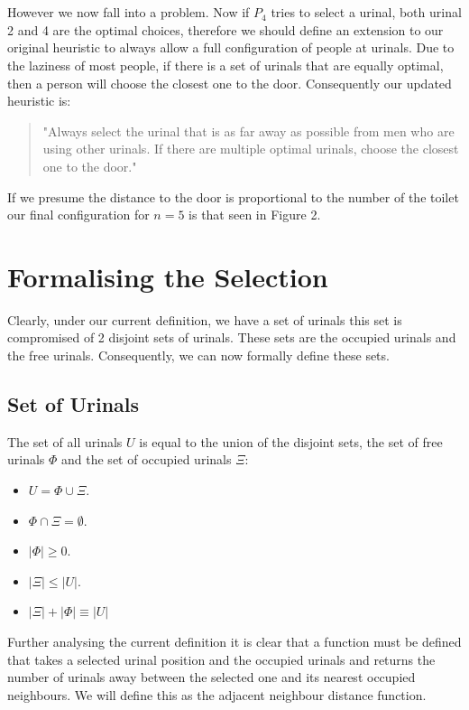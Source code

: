 \documentclass{article}
\begin{document}
\\\\However we now fall into a problem. Now if $P_{4}$ tries to select a urinal, both urinal 2 and 4 are the optimal choices, therefore we should define an extension to our original heuristic to always allow a full configuration of people at urinals. Due to the laziness of most people, if there is a set of urinals that are equally optimal, then a person will choose the closest one to the door. Consequently our updated heuristic is:
\begin{quote}
    "Always select the urinal that is as far away as possible from men who are using other urinals. If there are multiple optimal urinals, choose the closest one to the door."
\end{quote}
If we presume the distance to the door is proportional to the number of the toilet our final configuration for $n=5$ is that seen in Figure 2. 

\section{Formalising the Selection}
Clearly, under our current definition, we have a set of urinals this set is compromised of 2 disjoint sets of urinals. These sets are the occupied urinals and the free urinals. Consequently, we can now formally define these sets.
\begin{framed}
  \section*{Set of Urinals}
    The set of all urinals $U$ is equal to the union of the disjoint sets, the set of free urinals $\Phi$ and the set of occupied urinals $\Xi$:
    \begin{itemize}
        \item $U = \Phi \cup \Xi$.
        \item $\Phi \cap \Xi = \emptyset$.
        \item $\left|\Phi\right| \geq 0$.
        \item $\left|\Xi\right| \leq \left|U\right|$.
        \item $\left|\Xi\right| + \left|\Phi\right| \equiv \left|U\right|$ 
    \end{itemize}
\end{framed}
Further analysing the current definition it is clear that a function must be defined that takes a selected urinal position and the occupied urinals and returns the number of urinals away between the selected one and its nearest occupied neighbours. We will define this as the adjacent neighbour distance function.
\end{document}
